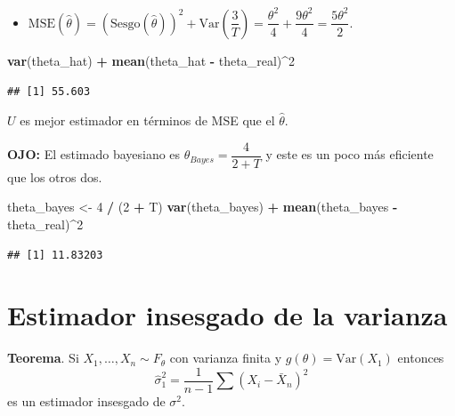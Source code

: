 \documentclass[
  12pt,
]{book}
\newenvironment{Shaded}{\begin{snugshade}}{\end{snugshade}}
\newcommand{\DecValTok}[1]{\textcolor[rgb]{0.00,0.00,0.81}{#1}}
\newcommand{\KeywordTok}[1]{\textcolor[rgb]{0.13,0.29,0.53}{\textbf{#1}}}
\newcommand{\NormalTok}[1]{#1}
\newcommand{\OperatorTok}[1]{\textcolor[rgb]{0.81,0.36,0.00}{\textbf{#1}}}
\newcommand{\StringTok}[1]{\textcolor[rgb]{0.31,0.60,0.02}{#1}}
\providecommand{\tightlist}{%
  \setlength{\itemsep}{0pt}\setlength{\parskip}{0pt}}
\begin{document}
\begin{itemize}
\tightlist
\item
  \(\mathrm{MSE}(\hat\theta) = (\text{Sesgo}(\hat\theta))^2+\text{Var}\left(\dfrac 3T\right) = \dfrac{\theta^2}{4}+\dfrac{9\theta^2}{4} = \dfrac{5\theta^2}{2}\).
\end{itemize}

\begin{Shaded}
\begin{Highlighting}[]
\KeywordTok{var}\NormalTok{(theta\_hat) }\OperatorTok{+}\StringTok{ }\KeywordTok{mean}\NormalTok{(theta\_hat }\OperatorTok{{-}}\StringTok{ }\NormalTok{theta\_real)}\OperatorTok{\^{}}\DecValTok{2}
\end{Highlighting}
\end{Shaded}

\begin{verbatim}
## [1] 55.603
\end{verbatim}

\(U\) es mejor estimador en términos de MSE que el \(\hat\theta\).

\textbf{OJO:} El estimado bayesiano es \(\theta_{Bayes} = \dfrac{4}{2+T}\) y este es
un poco más eficiente que los otros dos.

\begin{Shaded}
\begin{Highlighting}[]
\NormalTok{theta\_bayes \textless{}{-}}\StringTok{ }\DecValTok{4} \OperatorTok{/}\StringTok{ }\NormalTok{(}\DecValTok{2} \OperatorTok{+}\StringTok{ }\NormalTok{T)}
\KeywordTok{var}\NormalTok{(theta\_bayes) }\OperatorTok{+}\StringTok{ }\KeywordTok{mean}\NormalTok{(theta\_bayes }\OperatorTok{{-}}\StringTok{ }\NormalTok{theta\_real)}\OperatorTok{\^{}}\DecValTok{2}
\end{Highlighting}
\end{Shaded}

\begin{verbatim}
## [1] 11.83203
\end{verbatim}

\hypertarget{estimador-insesgado-de-la-varianza}{%
\section{Estimador insesgado de la varianza}\label{estimador-insesgado-de-la-varianza}}

\textbf{Teorema}. Si \(X_1,\dots, X_n \sim F_{\theta}\) con varianza finita y \(g(\theta) = \text{Var}(X_1)\) entonces
\[\hat\sigma_1^2 = \dfrac{1}{n-1}\sum(X_i-\bar X_n)^2\]
es un estimador insesgado de \(\sigma^2\).
\end{document}
